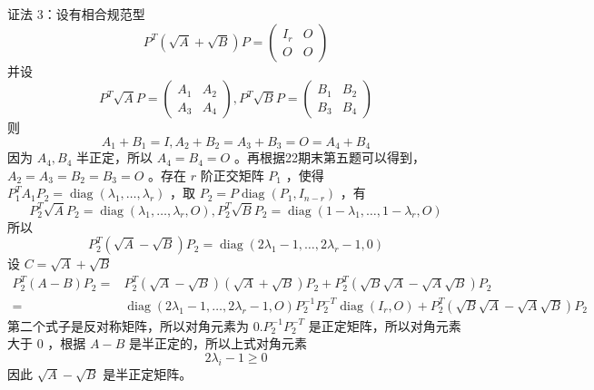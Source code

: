 \documentclass[UTF8]{ctexart}
\begin{document}
证法 3：设有相合规范型 $$P^{T}(\sqrt{A}+\sqrt{B}) P=\left(\begin{array}{cc}I_{r} & O \\ O & O\end{array}\right)$$
并设
$$
P^{T} \sqrt{A} P=\left(\begin{array}{ll}
	A_{1} & A_{2} \\
	A_{3} & A_{4}
\end{array}\right), P^{T} \sqrt{B} P=\left(\begin{array}{ll}
	B_{1} & B_{2} \\
	B_{3} & B_{4}
\end{array}\right)
$$
则
$$
A_{1}+B_{1}=I, A_{2}+B_{2}=A_{3}+B_{3}=O=A_{4}+B_{4}
$$
因为 $A_{4}, B_{4}$ 半正定，所以 $A_{4}=B_{4}=O$ 。再根据22期末第五题可以得到，$A_{2}=A_{3}=B_{2}=B_{3}=O$ 。存在 $r$ 阶正交矩阵 $P_{1}$ ，使得 $P_{1}^{T} A_{1} P_{2}=\operatorname{diag}\left(\lambda_{1}, \ldots, \lambda_{r}\right)$ ，取 $P_{2}=P \operatorname{diag}\left(P_{1}, I_{n-r}\right)$ ，有
$$
P_{2}^{T} \sqrt{A} P_{2}=\operatorname{diag}\left(\lambda_{1}, \ldots, \lambda_{r}, O\right), P_{2}^{T} \sqrt{B} P_{2}=\operatorname{diag}\left(1-\lambda_{1}, \ldots, 1-\lambda_{r}, O\right)
$$
所以
$$
P_{2}^{T}(\sqrt{A}-\sqrt{B}) P_{2}=\operatorname{diag}\left(2 \lambda_{1}-1, \ldots, 2 \lambda_{r}-1,0\right)
$$
设 $C=\sqrt{A}+\sqrt{B}$ 
$$
\begin{aligned}
	P_{2}^{T}(A-B) P_{2}= & P_{2}^{T}(\sqrt{A}-\sqrt{B})(\sqrt{A}+\sqrt{B}) P_{2}+P_{2}^{T}(\sqrt{B} \sqrt{A}-\sqrt{A} \sqrt{B}) P_{2} \\
	= & \operatorname{diag}\left(2 \lambda_{1}-1, \ldots, 2 \lambda_{r}-1, O\right) P_{2}^{-1} P_{2}^{-T} \operatorname{diag}\left(I_{r}, O\right)+P_{2}^{T}(\sqrt{B} \sqrt{A}-\sqrt{A} \sqrt{B}) P_{2}
\end{aligned}
$$
第二个式子是反对称矩阵，所以对角元素为 $0 . P_{2}^{-1} P_{2}^{-T}$ 是正定矩阵，所以对角元素大于 0 ，根据 $A-B$ 是半正定的，所以上式对角元素
$$
2 \lambda_{i}-1 \geq 0
$$
因此 $\sqrt{A}-\sqrt{B}$ 是半正定矩阵。
\end{document}
